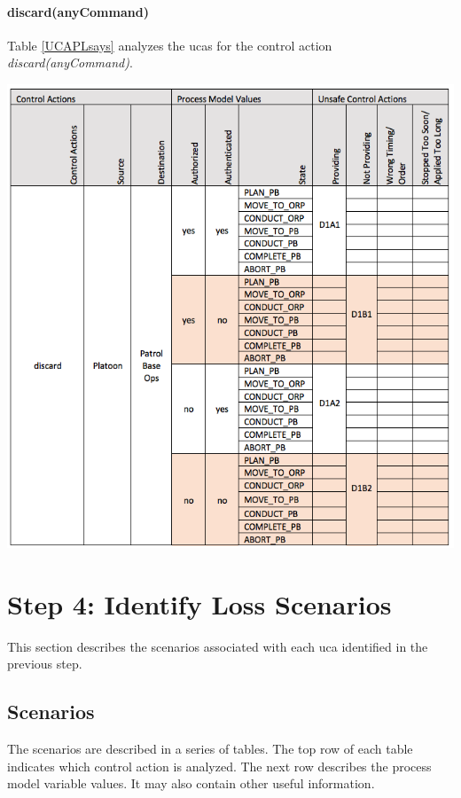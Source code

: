 \documentclass[../../main/main.tex]{subfiles}
\begin{document}
\paragraph*{discard(anyCommand)}
Table \ref{UCAPLsays} analyzes the \glspl{uca} for the control action \textit{discard(anyCommand)}.
\begin{table}[ht!]
\begin{center}
\includegraphics[width=\linewidth]{../figures/ucadiscards}
\caption{Unsafe control actions \glspl{uca} for control action "discard(anyCommand)."}
\label{UCAdiscard}
\end{center}
\end{table}
\clearpage
\section{Step 4: Identify Loss Scenarios}\label{chp:stpapb:scenarios}
This section describes the scenarios associated with each \gls{uca} identified in the previous step. 

\subsection{Scenarios}
The scenarios are described in a series of tables.  The top row of each table indicates which control action is analyzed.  The next row describes the process model variable values.  It may also contain other useful information.
\end{document}
